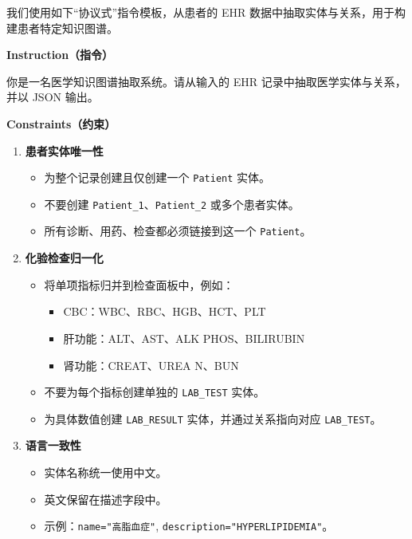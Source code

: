 \documentclass[11pt]{article}
\providecommand{\tightlist}{\setlength{\itemsep}{0pt}\setlength{\parskip}{0pt}}
\begin{document}
我们使用如下``协议式''指令模板，从患者的 EHR 数据中抽取实体与关系，用于构建患者特定知识图谱。

\textbf{Instruction（指令）}

你是一名医学知识图谱抽取系统。请从输入的 EHR 记录中抽取医学实体与关系，并以 JSON 输出。

\textbf{Constraints（约束）}

\begin{enumerate}
\def\labelenumi{\arabic{enumi}.}
\tightlist
\item
  \textbf{患者实体唯一性}

  \begin{itemize}
  \tightlist
  \item
    为整个记录创建且仅创建一个 \texttt{Patient} 实体。
  \item
    不要创建 \texttt{Patient\_1}、\texttt{Patient\_2} 或多个患者实体。
  \item
    所有诊断、用药、检查都必须链接到这一个 \texttt{Patient}。
  \end{itemize}
\item
  \textbf{化验检查归一化}

  \begin{itemize}
  \tightlist
  \item
    将单项指标归并到检查面板中，例如：

    \begin{itemize}
    \tightlist
    \item
      CBC：WBC、RBC、HGB、HCT、PLT
    \item
      肝功能：ALT、AST、ALK PHOS、BILIRUBIN
    \item
      肾功能：CREAT、UREA N、BUN
    \end{itemize}
  \item
    不要为每个指标创建单独的 \texttt{LAB\_TEST} 实体。
  \item
    为具体数值创建 \texttt{LAB\_RESULT} 实体，并通过关系指向对应 \texttt{LAB\_TEST}。
  \end{itemize}
\item
  \textbf{语言一致性}

  \begin{itemize}
  \tightlist
  \item
    实体名称统一使用中文。
  \item
    英文保留在描述字段中。
  \item
    示例：\texttt{name="高脂血症"}, \texttt{description="HYPERLIPIDEMIA"}。
  \end{itemize}
\end{enumerate}
\end{document}
